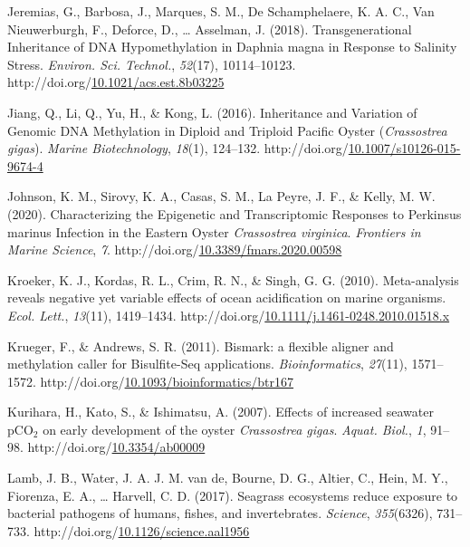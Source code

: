 \documentclass [11pt, proquest] {uwthesis}[2015/03/03]
\newlength{\cslhangindent}
\newenvironment{CSLReferences}%
{\setlength{\parindent}{0pt}%
\everypar{\setlength{\hangindent}{\cslhangindent}}\ignorespaces}%
{\par}
\begin{document}
\begin{CSLReferences}{1}{0}
\leavevmode\hypertarget{ref-Jeremias2018}{}%
Jeremias, G., Barbosa, J., Marques, S. M., De Schamphelaere, K. A. C., Van Nieuwerburgh, F., Deforce, D., \ldots{} Asselman, J. (2018). {Transgenerational Inheritance of DNA Hypomethylation in Daphnia magna in Response to Salinity Stress}. \emph{Environ. Sci. Technol.}, \emph{52}(17), 10114--10123. http://doi.org/\href{https://doi.org/10.1021/acs.est.8b03225}{10.1021/acs.est.8b03225}

\leavevmode\hypertarget{ref-Jiang2016}{}%
Jiang, Q., Li, Q., Yu, H., \& Kong, L. (2016). {Inheritance and Variation of Genomic DNA Methylation in Diploid and Triploid Pacific Oyster (\emph{Crassostrea gigas})}. \emph{Marine Biotechnology}, \emph{18}(1), 124--132. http://doi.org/\href{https://doi.org/10.1007/s10126-015-9674-4}{10.1007/s10126-015-9674-4}

\leavevmode\hypertarget{ref-Johnson2020}{}%
Johnson, K. M., Sirovy, K. A., Casas, S. M., La Peyre, J. F., \& Kelly, M. W. (2020). {Characterizing the Epigenetic and Transcriptomic Responses to Perkinsus marinus Infection in the Eastern Oyster \emph{Crassostrea virginica}}. \emph{Frontiers in Marine Science}, \emph{7}. http://doi.org/\href{https://doi.org/10.3389/fmars.2020.00598}{10.3389/fmars.2020.00598}

\leavevmode\hypertarget{ref-Kroeker2010}{}%
Kroeker, K. J., Kordas, R. L., Crim, R. N., \& Singh, G. G. (2010). {Meta-analysis reveals negative yet variable effects of ocean acidification on marine organisms}. \emph{Ecol. Lett.}, \emph{13}(11), 1419--1434. http://doi.org/\href{https://doi.org/10.1111/j.1461-0248.2010.01518.x}{10.1111/j.1461-0248.2010.01518.x}

\leavevmode\hypertarget{ref-Krueger2011}{}%
Krueger, F., \& Andrews, S. R. (2011). {Bismark: a flexible aligner and methylation caller for Bisulfite-Seq applications}. \emph{Bioinformatics}, \emph{27}(11), 1571--1572. http://doi.org/\href{https://doi.org/10.1093/bioinformatics/btr167}{10.1093/bioinformatics/btr167}

\leavevmode\hypertarget{ref-Kurihara2007}{}%
Kurihara, H., Kato, S., \& Ishimatsu, A. (2007). {Effects of increased seawater {pCO\(_2\)} on early development of the oyster \emph{Crassostrea gigas}}. \emph{Aquat. Biol.}, \emph{1}, 91--98. http://doi.org/\href{https://doi.org/10.3354/ab00009}{10.3354/ab00009}

\leavevmode\hypertarget{ref-Lamb2017}{}%
Lamb, J. B., Water, J. A. J. M. van de, Bourne, D. G., Altier, C., Hein, M. Y., Fiorenza, E. A., \ldots{} Harvell, C. D. (2017). {Seagrass ecosystems reduce exposure to bacterial pathogens of humans, fishes, and invertebrates}. \emph{Science}, \emph{355}(6326), 731--733. http://doi.org/\href{https://doi.org/10.1126/science.aal1956}{10.1126/science.aal1956}


\end{CSLReferences}
\end{document}
